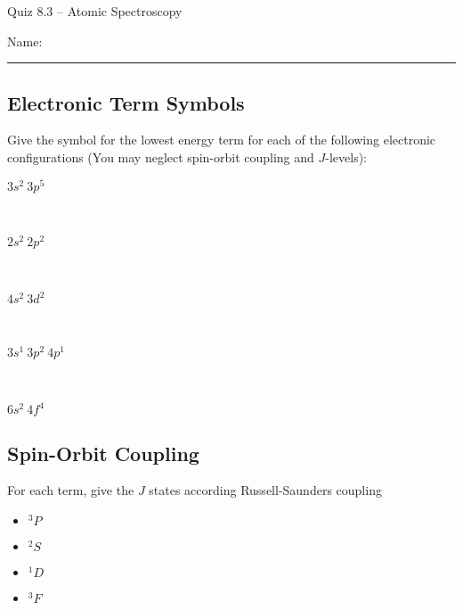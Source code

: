 \documentclass[11pt, letterpaper]{memoir}
\begin{document}
\begin{center}
	{\large Quiz 8.3 -- Atomic Spectroscopy}
\end{center}
{\large Name: \rule[-1mm]{4in}{.1pt}


\subsection*{Electronic Term Symbols}
Give the symbol for the lowest energy term for each of the following electronic configurations (You may neglect spin-orbit coupling and $J$-levels):

\begin{description}
	\item[$3s^2~3p^5$]~

	\vspace{3em}
	\item[$2s^2~2p^2$] ~

	\vspace{3em}
	\item[$4s^2~3d^2$] ~

	\vspace{3em}
	\item[$3s^1~3p^2~4p^1$] ~

	\vspace{3em}
	\item[$6s^2~4f^4$]
\end{description}

\vspace{2em}
\subsection*{Spin-Orbit Coupling}

For each term, give the $J$ states according Russell-Saunders coupling

\begin{itemize}
	\item $^3P$

	      \vspace{3em}
	\item $^2S$

	      \vspace{3em}
	\item $^1D$

	      \vspace{3em}
	\item $^3F$
\end{itemize}

\vspace{2em}
}
\end{document}
